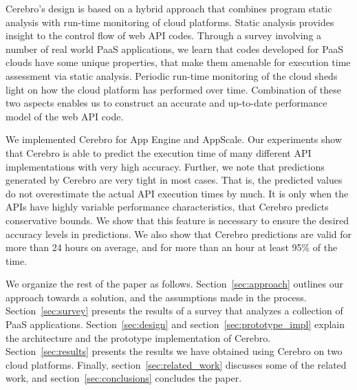 Cerebro's design is based on a hybrid approach that combines program static analysis with run-time
monitoring of cloud platforms. Static analysis provides insight to the control flow of web
API codes. Through a survey involving a number
of real world PaaS applications, we learn that codes developed for PaaS clouds have
some unique properties, that make them amenable for execution time assessment via static 
analysis. Periodic run-time monitoring of the cloud sheds light on how
the cloud platform has performed over time. Combination of these two aspects enables
us to construct an accurate and up-to-date performance model of the web API code. 


We implemented Cerebro for App Engine and AppScale.
Our experiments show that Cerebro is able to predict the execution time
of many different API implementations with very high accuracy. 
Further, we note that
predictions generated by Cerebro are very tight in most cases. That is, the predicted values do not
overestimate the actual API execution times by much. It is only when the APIs have highly variable 
performance characteristics, that Cerebro predicts conservative bounds. We show that this feature 
is necessary to ensure the desired accuracy levels in predictions.
We also show that Cerebro predictions
are valid for more than 24 hours on average, and for more than an hour at least 95\% of the time.

We organize the rest of the paper as follows. Section~\ref{sec:approach} outlines our approach towards
a solution, and the assumptions made in the process. Section~\ref{sec:survey}
presents the results of a survey that analyzes a collection of PaaS applications. Section~\ref{sec:design}
and section~\ref{sec:prototype_impl} explain the architecture and the prototype implementation of Cerebro.
Section~\ref{sec:results} presents the results we have obtained using Cerebro on two cloud platforms.
Finally, section~\ref{sec:related_work} discusses some of the related work, and section~\ref{sec:conclusions}
concludes the paper.